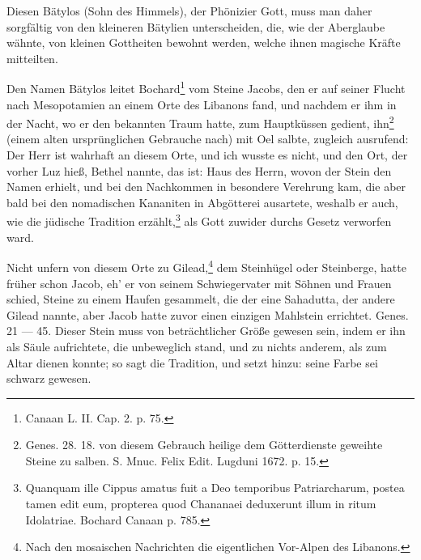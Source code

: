 \documentclass[a4paper, 11pt, oneside, polutonikogreek, german]{article}
\begin{document}
Diesen Bätylos (Sohn des Himmels), der Phönizier Gott, muss man daher sorgfältig von den kleineren Bätylien unterscheiden, die, wie der Aberglaube wähnte, von kleinen Gottheiten bewohnt werden, welche ihnen magische Kräfte mitteilten.

Den Namen Bätylos leitet Bochard\footnote{Canaan L. II. Cap. 2. p. 75.} vom Steine Jacobs, den er auf seiner Flucht nach Mesopotamien an einem Orte des Libanons fand, und nachdem er ihm in der Nacht, wo er den bekannten Traum hatte, zum Hauptküssen gedient, ihn\footnote{Genes. 28. 18. von diesem Gebrauch heilige dem Götterdienste geweihte Steine zu salben. S. Mnuc. Felix Edit. Lugduni 1672. p. 15.} (einem alten ursprünglichen Gebrauche nach) mit Oel salbte, zugleich ausrufend: Der Herr ist wahrhaft an diesem Orte, und ich wusste es nicht, und den Ort, der vorher Luz hieß, Bethel nannte, das ist: Haus des Herrn, wovon der Stein den Namen erhielt, und bei den Nachkommen in besondere Verehrung kam, die aber bald bei den nomadischen Kananiten in Abgötterei ausartete, weshalb er auch, wie die jüdische Tradition erzählt,\footnote{Quanquam ille Cippus amatus fuit a Deo temporibus Patriarcharum, postea tamen edit eum, propterea quod Chananaei deduxerunt illum in ritum Idolatriae. Bochard Canaan p. 785.} als Gott zuwider durchs Gesetz verworfen ward.

Nicht unfern von diesem Orte zu Gilead,\footnote{Nach den mosaischen Nachrichten die eigentlichen Vor-Alpen des Libanons.} dem Steinhügel oder Steinberge, hatte früher schon Jacob, eh' er von seinem Schwiegervater mit Söhnen und Frauen schied, Steine zu einem Haufen gesammelt, die der eine Sahadutta, der andere Gilead nannte, aber Jacob hatte zuvor einen einzigen Mahlstein errichtet. Genes. 21 --- 45. Dieser Stein muss von beträchtlicher Größe gewesen sein, indem er ihn als Säule aufrichtete, die unbeweglich stand, und zu nichts anderem, als zum Altar dienen konnte; so sagt die Tradition, und setzt hinzu: seine Farbe sei schwarz gewesen.
\end{document}
